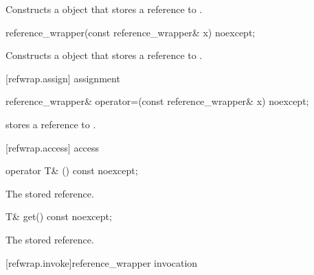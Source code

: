 \begin{itemdescr}
\pnum
\effects Constructs a  object that stores a
reference to .
\end{itemdescr}

%
\begin{itemdecl}
reference_wrapper(const reference_wrapper& x) noexcept;
\end{itemdecl}

\begin{itemdescr}
\pnum\effects Constructs a  object that
stores a reference to .
\end{itemdescr}

[refwrap.assign]{ assignment}

\begin{itemdecl}
reference_wrapper& operator=(const reference_wrapper& x) noexcept;
\end{itemdecl}

\begin{itemdescr}
\pnum\postcondition {} stores a reference to  .
\end{itemdescr}

[refwrap.access]{ access}

\begin{itemdecl}
operator T& () const noexcept;
\end{itemdecl}

\begin{itemdescr}
\pnum\returns The stored reference.
\end{itemdescr}

%
%
\begin{itemdecl}
T& get() const noexcept;
\end{itemdecl}

\begin{itemdescr}
\pnum\returns The stored reference.
\end{itemdescr}


[refwrap.invoke]{reference_wrapper invocation}

